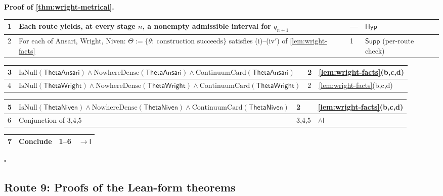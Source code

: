 \documentclass[11pt,reqno]{amsart}
\theoremstyle{blueplain}
\renewcommand{\qedsymbol}{\textcolor{proofqed}{\ensuremath{\square}}}
\renewenvironment{proof}[1][Proof]{\par\noindent\textbf{\textcolor{proofhead}{#1.}}\par\nobreak}{\par\nobreak\hfill\qedsymbol}
\numberwithin{equation}{section}
\begin{document}
\begin{proof}[\textbf{Proof of \cref{thm:wright-metrical}}]
\label{proof:wright-metrical}
{\scriptsize
\begin{tabular}{|m{0.7cm}|m{12cm}|m{1.4cm}|m{2.5cm}|}
\hline
1 & Each route yields, at every stage $n$, a nonempty admissible interval for $q_{n+1}$ & --- & $\mathsf{Hyp}$ \\ \hline
2 & For each of Ansari, Wright, Niven: $\Theta:=\{\theta:\ \text{construction succeeds}\}$ satisfies (i)--(iv$'$) of \cref{lem:wright-facts} & 1 & $\mathsf{Supp}$ (per-route check) \\
\end{tabular}%
\noindent \newline
\noindent
\begin{tabular}{|m{0.7cm}|m{12cm}|m{1.4cm}|m{2.5cm}|}
\hline
3 & $\mathrm{IsNull}(\mathsf{ThetaAnsari})\wedge\mathrm{NowhereDense}(\mathsf{ThetaAnsari})\wedge\mathrm{ContinuumCard}(\mathsf{ThetaAnsari})$ & 2 & \cref{lem:wright-facts}(b,c,d) \\ \hline
4 & $\mathrm{IsNull}(\mathsf{ThetaWright})\wedge\mathrm{NowhereDense}(\mathsf{ThetaWright})\wedge\mathrm{ContinuumCard}(\mathsf{ThetaWright})$ & 2 & \cref{lem:wright-facts}(b,c,d) \\
\end{tabular}%
\noindent \newline
\noindent
\begin{tabular}{|m{0.7cm}|m{12cm}|m{1.4cm}|m{2.5cm}|}
\hline
5 & $\mathrm{IsNull}(\mathsf{ThetaNiven})\wedge\mathrm{NowhereDense}(\mathsf{ThetaNiven})\wedge\mathrm{ContinuumCard}(\mathsf{ThetaNiven})$ & 2 & \cref{lem:wright-facts}(b,c,d) \\ \hline
6 & Conjunction of 3,4,5 & 3,4,5 & $\wedge\mathsf{I}$ \\
\end{tabular}%
\noindent \newline
\noindent
\begin{tabular}{|m{0.7cm}|m{12cm}|m{1.4cm}|m{2.5cm}|}
\hline
7 & Conclude & 1--6 & $\rightarrow\mathsf{I}$ \\ \hline
\end{tabular}%
}
\end{proof}

\subsection{Route 9: Proofs of the Lean-form theorems}
\label{sec:route-lean}
\end{document}
